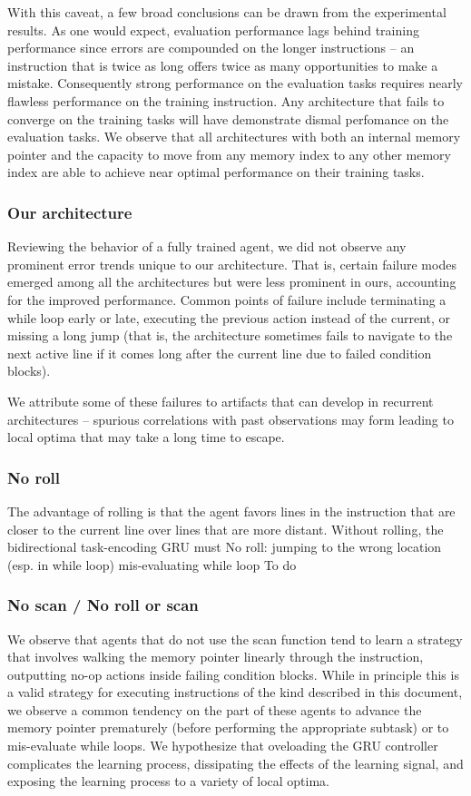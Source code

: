 \documentclass{article}
\begin{document}
With this caveat, a few broad conclusions can be drawn from the experimental
results. As one would expect, evaluation performance lags behind training
performance since errors are compounded on the longer instructions -- an
instruction that is twice as long offers twice as many opportunities to make a
mistake. Consequently strong performance on the evaluation tasks requires
nearly flawless performance on the training instruction. Any architecture that fails to
converge on the training tasks will have demonstrate dismal perfomance on the
evaluation tasks.  We observe that all architectures with both an internal memory pointer and the
capacity to move from any memory index to any other memory index are able to
achieve near optimal performance on their training tasks. 

\subsubsection{Our architecture}
Reviewing the behavior of a fully trained agent, we did not observe any
prominent error trends unique to our architecture. That is, certain failure
modes emerged among all the architectures but were less prominent in ours,
accounting for the improved performance. Common points of failure include
terminating a while loop early or late, executing the previous action instead of
the current, or missing a long jump (that is, the architecture sometimes fails
to navigate to the next active line if it comes long after the current line due
to failed condition blocks).

We attribute some of these failures to artifacts that can develop in recurrent
architectures -- spurious correlations with past observations may form leading
to local optima that may take a long time to escape.

\subsubsection{No roll}
The advantage of rolling is that the agent favors lines in the instruction that
are closer to the current line over lines that are more distant. Without
rolling, the bidirectional task-encoding GRU must 
No roll: jumping to the wrong location (esp. in while loop) mis-evaluating while
loop
To do

\subsubsection{No scan / No roll or scan}
We observe that agents that do not use the scan function tend to learn a
strategy that involves walking the memory pointer linearly through the
instruction, outputting no-op actions inside failing condition blocks. While in
principle this is a valid strategy for executing instructions of the kind
described in this document, we observe a common tendency on the part of these agents to 
advance the memory pointer prematurely (before performing the appropriate
subtask) or to mis-evaluate while loops. We hypothesize that oveloading the
GRU controller complicates the learning process, dissipating the effects of the
learning signal, and exposing the learning process to a variety of local optima.
\end{document}
